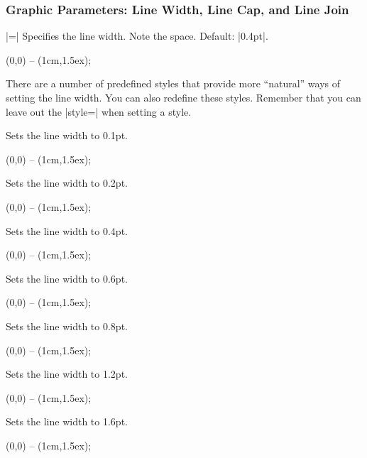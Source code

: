 \subsubsection{Graphic Parameters: Line Width, Line Cap, and Line Join}

\label{section-cap-joins}

\begin{itemize}
  |=|
  Specifies the line width. Note the space. Default: |0.4pt|.

\begin{codeexample}[]
  \tikz \draw[line width=5pt] (0,0) -- (1cm,1.5ex);
\end{codeexample}
\end{itemize}

There are a number of predefined styles that provide more ``natural''
ways of setting the line width. You can also redefine these
styles. Remember that you can leave out the |style=| when setting a
style.

\begin{itemize}
  Sets the line width to 0.1pt.
\begin{codeexample}[]
  \tikz {} (0,0) -- (1cm,1.5ex);
\end{codeexample}

  Sets the line width to 0.2pt.
\begin{codeexample}[]
  \tikz {} (0,0) -- (1cm,1.5ex);
\end{codeexample}

  Sets the line width to 0.4pt.
\begin{codeexample}[]
  \tikz \draw[thin] (0,0) -- (1cm,1.5ex);
\end{codeexample}

  Sets the line width to 0.6pt.
\begin{codeexample}[]
  \tikz \draw[semithick] (0,0) -- (1cm,1.5ex);
\end{codeexample}

  Sets the line width to 0.8pt.
\begin{codeexample}[]
  \tikz \draw[thick] (0,0) -- (1cm,1.5ex);
\end{codeexample}

  Sets the line width to 1.2pt.
\begin{codeexample}[]
  \tikz {} (0,0) -- (1cm,1.5ex);
\end{codeexample}

  Sets the line width to 1.6pt.
\begin{codeexample}[]
  \tikz {} (0,0) -- (1cm,1.5ex);
\end{codeexample}
\end{itemize}

